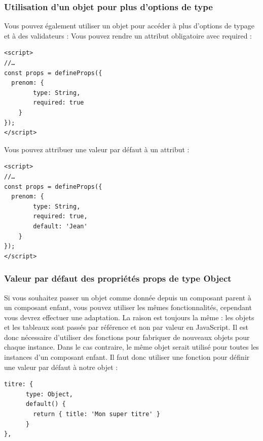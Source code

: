 \subsubsection{Utilisation d'un objet pour plus d'options de type}
Vous pouvez également utiliser un objet pour accéder à plus d'options de typage et à des validateurs : Vous pouvez rendre un attribut obligatoire avec {\color{monOrange}required} :
\begin{verbatim}
<script>
//…
const props = defineProps({
  prenom: {
        type: String,
        required: true
    }
});
</script>
\end{verbatim}
Vous pouvez attribuer une valeur par défaut à un attribut :
\begin{verbatim}
<script>
//…
const props = defineProps({
  prenom: {
        type: String,
        required: true,
        default: 'Jean'
    }
});
</script>
\end{verbatim}

\subsubsection{Valeur par défaut des propriétés {\color{monOrange}props} de type {\color{monOrange}Object}}
Si vous souhaitez passer un objet comme donnée depuis un composant parent à un composant enfant, vous pouvez utiliser les mêmes fonctionnalités, cependant vous devrez effectuer une adaptation. La raison est toujours la même : les objets et les tableaux sont passés par référence et non par valeur en JavaScript. Il est donc nécessaire d'utiliser des fonctions pour fabriquer de nouveaux objets pour chaque instance. Dans le cas contraire, le même objet serait utilisé pour toutes les instances d'un composant enfant. Il faut donc utiliser une fonction pour définir une valeur par défaut à notre objet :
\begin{verbatim}
titre: {
      type: Object,
      default() {
        return { title: 'Mon super titre' }
      }
},
\end{verbatim}

